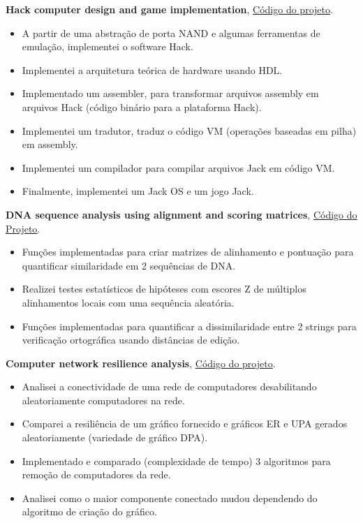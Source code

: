 \documentclass[a4paper,10pt]{article}
\newcommand{\ulink}[2]{\href{#1}{\underline{#2}}}
\begin{document}
\textbf{Hack computer design and game implementation}, \ulink{https://github.com/rokobo/From-Nand-gates-to-Tetris-implementation}{Código do projeto}.
\begin{itemize}[itemsep=0pt]
  \item A partir de uma abstração de porta NAND e algumas ferramentas de emulação, implementei o software Hack.
  \item Implementei a arquitetura teórica de hardware usando HDL.
  \item Implementado um assembler, para transformar arquivos assembly em arquivos Hack (código binário para a plataforma Hack).
  \item Implementei um tradutor, traduz o código VM (operações baseadas em pilha) em assembly.
  \item Implementei um compilador para compilar arquivos Jack em código VM.
  \item Finalmente, implementei um Jack OS e um jogo Jack.
\end{itemize}
\textbf{DNA sequence analysis using alignment and scoring matrices}, \ulink{https://github.com/rokobo/DNA-Sequence-Analysis}{Código do Projeto}.
\begin{itemize}[itemsep=0pt]
  \item Funções implementadas para criar matrizes de alinhamento e pontuação para quantificar similaridade em 2 sequências de DNA.
  \item Realizei testes estatísticos de hipóteses com escores Z de múltiplos alinhamentos locais com uma sequência aleatória.
  \item Funções implementadas para quantificar a dissimilaridade entre 2 strings para verificação ortográfica usando distâncias de edição.
\end{itemize}
\textbf{Computer network resilience analysis}, \ulink{https://github.com/rokobo/Computer-Network-Resilience-Analysis}{Código do projeto}.
\begin{itemize}[itemsep=0pt]
  \item Analisei a conectividade de uma rede de computadores desabilitando aleatoriamente computadores na rede.
  \item Comparei a resiliência de um gráfico fornecido e gráficos ER e UPA gerados aleatoriamente (variedade de gráfico DPA).
  \item Implementado e comparado (complexidade de tempo) 3 algoritmos para remoção de computadores da rede.
  \item Analisei como o maior componente conectado mudou dependendo do algoritmo de criação do gráfico.
\end{itemize}
\end{document}
